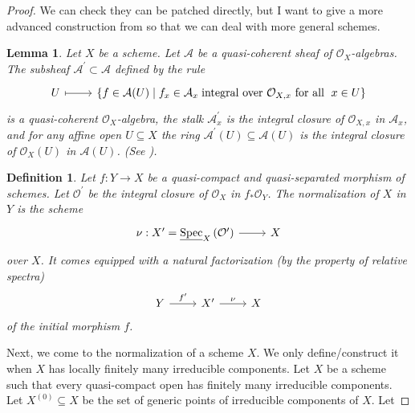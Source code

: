 \documentclass{amsart}
\newtheorem{defn}[theorem]{Definition}
\newtheorem{lm}[theorem]{Lemma}
\theoremstyle{remark}\newtheorem{rmk}[theorem]{Remark}
\begin{document}
\begin{proof}
We can check they can be patched directly,  but I want to give a more advanced construction from \cite{stacks-project} so that we can deal with more general schemes. 
\begin{lm}
 Let $X$ be a scheme. Let $\mathcal{A}$ be a quasi-coherent sheaf of $\mathcal{O}_{X}$-algebras.  The subsheaf $\mathcal{A}^{\prime} \subset \mathcal{A}$ defined by the rule
 \begin{equation*}
 	\begin{tikzcd}
 		U \arrow[r, maps to] & \left\{f \in \mathcal{A}(U) \mid f_{x} \in \mathcal{A}_{x}\right.\text{integral over }\mathcal{O}_{X, x}\text{ for all }\left.x \in U\right\}
 	\end{tikzcd}
 \end{equation*}
is a quasi-coherent $\mathcal{O}_{X}$-algebra, the stalk $\mathcal{A}_{x}^{\prime}$ is the integral closure of $\mathcal{O}_{X, x}$ in $\mathcal{A}_{x}$, and for any affine open $U \subseteq X$ the ring $\mathcal{A}^{\prime}(U) \subseteq \mathcal{A}(U)$ is the integral closure of $\mathcal{O}_{X}(U)$ in $\mathcal{A}(U)$.   \emph{(See \cite[\href{https://stacks.math.columbia.edu/tag/035F}{Tag 035F}]{stacks-project}).}
\end{lm}
\begin{defn}
Let $f: Y \rightarrow X$ be a quasi-compact and quasi-separated morphism of schemes. Let $\mathcal{O}^{\prime}$ be the integral closure of $\mathcal{O}_{X}$ in $f_{*} \mathcal{O}_{Y}$. The normalization of $X$ in $Y$ is the scheme
\begin{equation*}
	\begin{tikzcd}
		\nu: X^{\prime}=\underline{\operatorname{Spec}}_{X}\left(\mathcal{O}^{\prime}\right) \arrow[r] & X
	\end{tikzcd}
\end{equation*}
over $X$.  It comes equipped with a natural factorization (by the property of relative spectra)
\begin{equation*}
	\begin{tikzcd}
		Y \arrow[r, "f'"] & X' \arrow[r, "\nu"] & X
	\end{tikzcd}
\end{equation*}
of the initial morphism $f$.
\end{defn}
Next, we come to the normalization of a scheme $X .$ We only define/construct it when $X$ has locally finitely many irreducible components. Let $X$ be a scheme such that every quasi-compact open has finitely many irreducible components. Let $X^{(0)} \subseteq X$ be the set of generic points of irreducible components of $X .$ Let

\end{proof}
\end{document}
